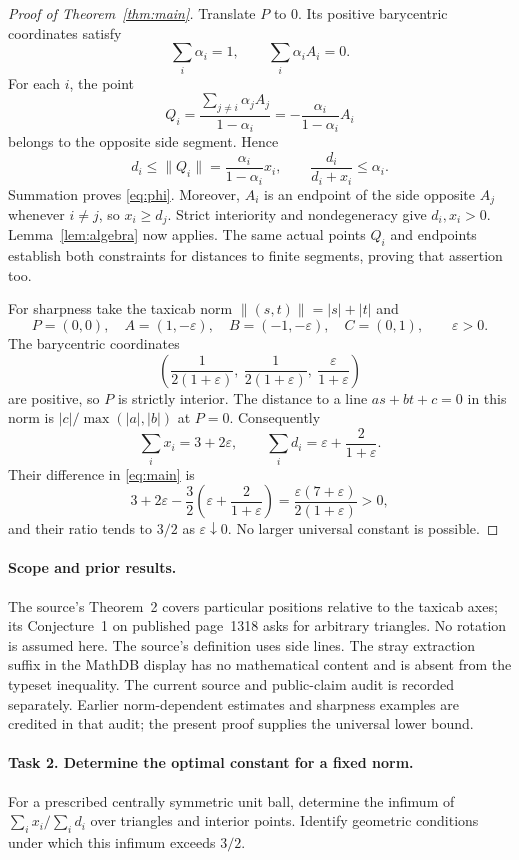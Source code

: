 \documentclass[11pt]{article}
\newcommand{\norm}[1]{\lVert #1\rVert}
\begin{document}
\begin{proof}[Proof of Theorem~\ref{thm:main}]
Translate \(P\) to \(0\). Its positive barycentric coordinates satisfy
\[
\sum_i\alpha_i=1,\qquad \sum_i\alpha_i A_i=0.
\]
For each \(i\), the point
\[
Q_i=\frac{\sum_{j\ne i}\alpha_j A_j}{1-\alpha_i}
=-\frac{\alpha_i}{1-\alpha_i}A_i
\]
belongs to the opposite side segment. Hence
\[
d_i\leq\norm{Q_i}
=\frac{\alpha_i}{1-\alpha_i}x_i,
\qquad
\frac{d_i}{d_i+x_i}\leq\alpha_i.
\]
Summation proves \eqref{eq:phi}. Moreover, \(A_i\) is an endpoint
of the side opposite \(A_j\) whenever \(i\ne j\), so \(x_i\geq d_j\).
Strict interiority and nondegeneracy give \(d_i,x_i>0\).
Lemma~\ref{lem:algebra} now applies. The same actual points \(Q_i\)
and endpoints establish both constraints for distances to finite
segments, proving that assertion too.

For sharpness take the taxicab norm \(\norm{(s,t)}=|s|+|t|\) and
\[
P=(0,0),\quad A=(1,-\varepsilon),\quad
B=(-1,-\varepsilon),\quad C=(0,1),\qquad\varepsilon>0.
\]
The barycentric coordinates
\[
\left(\frac1{2(1+\varepsilon)},\
\frac1{2(1+\varepsilon)},\
\frac{\varepsilon}{1+\varepsilon}\right)
\]
are positive, so \(P\) is strictly interior. The distance to a line
\(as+bt+c=0\) in this norm is
\(|c|/\max(|a|,|b|)\) at \(P=0\).
Consequently
\[
\sum_i x_i=3+2\varepsilon,\qquad
\sum_i d_i=\varepsilon+\frac2{1+\varepsilon}.
\]
Their difference in \eqref{eq:main} is
\[
3+2\varepsilon-\frac32\left(\varepsilon+\frac2{1+\varepsilon}\right)
=\frac{\varepsilon(7+\varepsilon)}{2(1+\varepsilon)}>0,
\]
and their ratio tends to \(3/2\) as \(\varepsilon\downarrow0\).
No larger universal constant is possible.
\end{proof}

\paragraph{Scope and prior results.}
The source's Theorem~2 covers particular positions relative to the
taxicab axes; its Conjecture~1 on published page~1318 asks for arbitrary
triangles. No rotation is assumed here. The source's definition uses
side lines. The stray extraction suffix in the MathDB display has no
mathematical content and is absent from the typeset inequality.
The current source and public-claim audit is recorded separately.
Earlier norm-dependent estimates and sharpness examples are credited
in that audit; the present proof supplies the universal lower bound.

\paragraph{Task 2. Determine the optimal constant for a fixed norm.}
For a prescribed centrally symmetric unit ball, determine the infimum
of \(\sum_i x_i/\sum_i d_i\) over triangles and interior points.
Identify geometric conditions under which this infimum exceeds \(3/2\).
\end{document}
